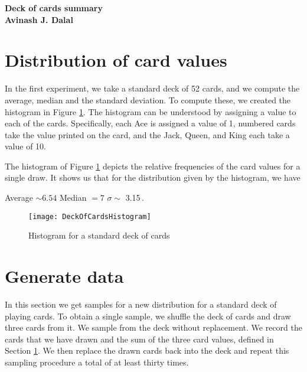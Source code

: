 \documentclass[12pt]{amsart}
\begin{document}
\begin{center}
\Large{\bf{Deck of cards summary}} \\
\large{\bf{Avinash J. Dalal}}
\end{center}


\section{Distribution of card values}
\label{DistributionOfCardValues}
In the first experiment, we take a standard deck of 52 cards, and we compute the average, median and the standard deviation.  To compute these, we created the histogram in Figure \ref{fig:DeckOfCardsHistogram}.  The histogram can be understood by assigning a value to each of the cards.  Specifically, each Ace is assigned a value of 1, numbered cards take the value printed on the card, and the Jack, Queen, and King each take a value of 10.

The histogram of Figure \ref{fig:DeckOfCardsHistogram} depicts the relative frequencies of the card values for a single draw.  It shows us that for the distribution given by the histogram, we have \\
\begin{center}
Average $\sim 6.54$ \hspace{0.3in} Median $= 7$ \hspace{0.3in} $\sigma \sim$ 3.15\,.
\end{center}

\begin{figure}[h]
    \centering
    \texttt{[image: DeckOfCardsHistogram]}
    \caption{Histogram for a standard deck of cards}
    \label{fig:DeckOfCardsHistogram}
\end{figure}

\section{Generate data}
In this section we get samples for a new distribution for a standard deck of playing cards.  To obtain a single sample, we shuffle the deck of cards and draw three cards from it.  We sample from the deck without replacement.  We record the cards that we have drawn and the sum of the three card values, defined in Section \ref{DistributionOfCardValues}.  We then replace the drawn cards back into the deck and repeat this sampling procedure a total of at least thirty times.
\end{document}
